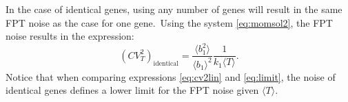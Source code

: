 \documentclass[aps,prb,reprint,superscriptaddress]{revtex4-2}
\begin{document}
In the case of identical genes, using any number of genes will result in the same FPT noise as the case for one gene.~Using the system \eqref{eq:momsol2}, the FPT noise results in the expression:
\begin{equation}\label{eq:limit}
\left(CV^2_T\right)_{\text{identical}}=\frac{\langle b_1^2\rangle}{\langle b_1\rangle^2}\frac{1}{k_1\langle T\rangle}.
\end{equation}
Notice that when comparing expressions \eqref{eq:cv2lin} and \eqref{eq:limit}, the noise of identical genes defines a lower limit for the FPT noise given $\langle T\rangle$.

\end{document}
